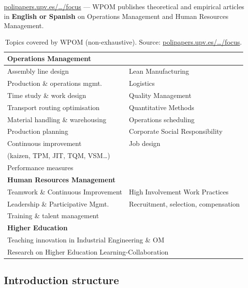 \documentclass{wpom-upv}
\begin{document}
\href{https://polipapers.upv.es/index.php/WPOM/focus}{polipapers.upv.es/…/focus}
— WPOM publishes theoretical and empirical articles in \textbf{English or
Spanish} on Operations Management and Human Resources Management.

\begin{table}[ht]
  \caption{Topics covered by WPOM (non-exhaustive).
           Source: \href{https://polipapers.upv.es/index.php/WPOM/focus}{polipapers.upv.es/…/focus}.}
  \label{tab:scope}
  \begin{tabularx}{\columnwidth}{XX}
    \toprule
    \multicolumn{2}{l}{\textbf{Operations Management}} \\
    \midrule
    Assembly line design              & Lean Manufacturing \\
    Production \& operations mgmt.   & Logistics \\
    Time study \& work design        & Quality Management \\
    Transport routing optimisation   & Quantitative Methods \\
    Material handling \& warehousing & Operations scheduling \\
    Production planning              & Corporate Social Responsibility \\
    Continuous improvement           & Job design \\
    \quad (kaizen, TPM, JIT, TQM, VSM\ldots) & \\
    Performance measures             & \\
    \midrule
    \multicolumn{2}{l}{\textbf{Human Resources Management}} \\
    \midrule
    Teamwork \& Continuous Improvement & High Involvement Work Practices \\
    Leadership \& Participative Mgmt.  & Recruitment, selection, compensation \\
    Training \& talent management      & \\
    \midrule
    \multicolumn{2}{l}{\textbf{Higher Education}} \\
    \midrule
    \multicolumn{2}{l}{Teaching innovation in Industrial Engineering \& OM} \\
    \multicolumn{2}{l}{Research on Higher Education Learning-Collaboration} \\
    \bottomrule
  \end{tabularx}
\end{table}

\subsection{Introduction structure}
\end{document}
